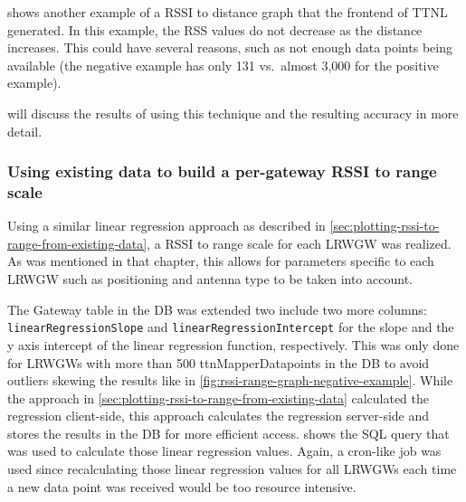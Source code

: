  shows another example of a \ac{RSSI} to distance graph that the frontend of \ac{TTNL} generated.
In this example, the \ac{RSS} values do not decrease as the distance increases.
This could have several reasons, such as not enough data points being available (the negative example has only 131 vs.\ almost 3,000 for the positive example).

 will discuss the results of using this technique and the resulting accuracy in more detail.

\subsubsection{Using existing data to build a per-gateway \acs{RSSI} to range scale}\label{subsubsec:per-gateway-rssi-to-range-scale}

Using a similar linear regression approach as described in \cref{sec:plotting-rssi-to-range-from-existing-data}, a \ac{RSSI} to range scale for each \acl{LRWGW} was realized.
As was mentioned in that chapter, this allows for parameters specific to each \acl{LRWGW} such as positioning and antenna type to be taken into account.

The Gateway table in the \ac{DB} was extended two include two more columns: \texttt{linear\-Regres\-sion\-Slope} and \texttt{linear\-Re\-gres\-sion\-Inter\-cept} for the slope and the y axis intercept of the linear regression function, respectively.
This was only done for \aclp{LRWGW} with more than 500 ttnMapperDatapoints in the \ac{DB} to avoid outliers skewing the results like in \cref{fig:rssi-range-graph-negative-example}.
While the approach in \cref{sec:plotting-rssi-to-range-from-existing-data} calculated the regression client-side, this approach calculates the regression server-side and stores the results in the \ac{DB} for more efficient access.
 shows the \ac{SQL} query that was used to calculate those linear regression values.
Again, a cron-like job was used since recalculating those linear regression values for all \aclp{LRWGW} each time a new data point was received would be too resource intensive.

